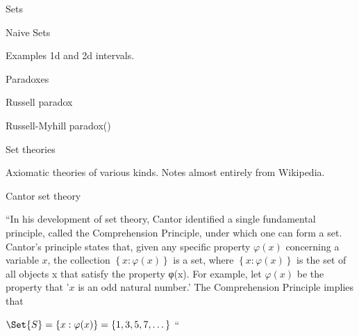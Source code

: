 \begin{plSection}{Sets}
\begin{plSection}{Naive Sets}
\begin{plSection}{Examples}
1d and 2d intervals.
 
% 
% 
% 
% 
% 
% 
\end{plSection}%
\end{plSection}%
\begin{plSection}{Paradoxes}
\label{sec:Paradoxes}

Russell paradox~\cite{iep:RussellParadox}

Russell-Myhill paradox(\cite{iep:RussellMyhillParadox})
\end{plSection}%
\begin{plSection}{Set theories}


Axiomatic theories of various kinds.
Notes almost entirely from 
Wikipedia\cite{wiki:Set_theory,iep:SetTheory,eom:SetTheory,sep:SetTheory}.

\begin{plSection}{Cantor set theory}
\label{sec:Cantor_set_theory}

``In his development of set theory, 
Cantor identified a single fundamental principle, 
called the Comprehension Principle, 
under which one can form a set.
Cantor’s principle states that, 
given any specific property $\varphi(x)$ 
concerning a variable $x$, 
the collection $\left\{x:\varphi(x)\right\}$ is a set, 
where $\left\{x:\varphi(x)\right\}$ is 
the set of all objects x that satisfy the property φ(x).
For example, let $\varphi(x)$ be the property that 
'$x$ is an odd natural number.' 
The Comprehension Principle implies that

$\Set{S}=\left\{x:\varphi(x)\right\}=\left\{1,3,5,7,\dots\right\}$ ``\cite{iep:SetTheory}


\end{plSection}
\end{plSection}
\end{plSection}
